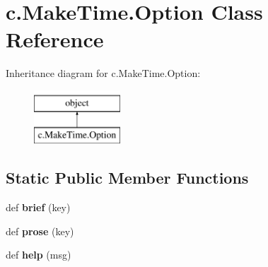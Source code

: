 \hypertarget{classc_1_1_make_time_1_1_option}{}\section{c.\+Make\+Time.\+Option Class Reference}
\label{classc_1_1_make_time_1_1_option}
Inheritance diagram for c.\+Make\+Time.\+Option\+:\begin{figure}[H]
\begin{center}
\leavevmode
\includegraphics[height=2.000000cm]{classc_1_1_make_time_1_1_option}
\end{center}
\end{figure}
\subsection*{Static Public Member Functions}
\begin{DoxyCompactItemize}
\item 
\hypertarget{classc_1_1_make_time_1_1_option_ae180a2b27f60fa03d3666417bbdcda4e}{}def {\bfseries brief} (key)\label{classc_1_1_make_time_1_1_option_ae180a2b27f60fa03d3666417bbdcda4e}

\item 
\hypertarget{classc_1_1_make_time_1_1_option_ab5fd9c4360b6a6d6b3fba8257f144d50}{}def {\bfseries prose} (key)\label{classc_1_1_make_time_1_1_option_ab5fd9c4360b6a6d6b3fba8257f144d50}

\item 
\hypertarget{classc_1_1_make_time_1_1_option_a89e8b12beafc3c529b6c873f62339060}{}def {\bfseries help} (msg)\label{classc_1_1_make_time_1_1_option_a89e8b12beafc3c529b6c873f62339060}

\end{DoxyCompactItemize}

